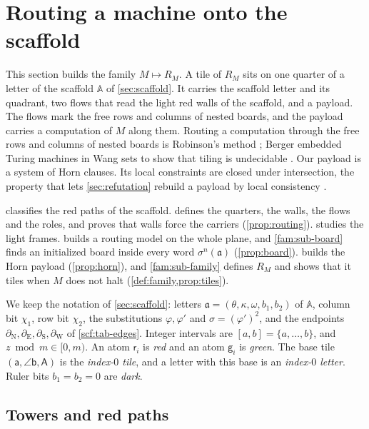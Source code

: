 \section{Routing a machine onto the scaffold}\label{sec:family}

This section builds the family $M\mapsto R_M$. A tile of $R_M$ sits on one quarter of a letter of the scaffold $\mathbb A$ of \cref{sec:scaffold}. It carries the scaffold letter and its quadrant, two flows that read the light red walls of the scaffold, and a payload. The flows mark the free rows and columns of nested boards, and the payload carries a computation of $M$ along them. Routing a computation through the free rows and columns of nested boards is Robinson's method \cite{Robinson71}; Berger embedded Turing machines in Wang sets to show that tiling is undecidable \cite{Berger66}. Our payload is a system of Horn clauses. Its local constraints are closed under intersection, the property that lets \cref{sec:refutation} rebuild a payload by local consistency \cite{JCG97,FederVardi98}.

 classifies the red paths of the scaffold.  defines the quarters, the walls, the flows and the roles, and proves that walls force the carriers (\cref{prop:routing}).  studies the light frames.  builds a routing model on the whole plane, and \cref{fam:sub-board} finds an initialized board inside every word $\sigma^n(\mathfrak a)$ (\cref{prop:board}).  builds the Horn payload (\cref{prop:horn}), and \cref{fam:sub-family} defines $R_M$ and shows that it tiles when $M$ does not halt (\cref{def:family,prop:tiles}).

We keep the notation of \cref{sec:scaffold}: letters $\mathfrak a=(\theta,\kappa,\omega,b_1,b_2)$ of $\mathbb A$, column bit $\chi_1$, row bit $\chi_2$, the substitutions $\varphi,\varphi'$ and $\sigma=(\varphi')^2$, and the endpoints $\partial_{\mathrm N},\partial_{\mathrm E},\partial_{\mathrm S},\partial_{\mathrm W}$ of \cref{scf:tab-edges}. Integer intervals are $[a,b]=\{a,\dots,b\}$, and $z\bmod m\in[0,m)$. An atom $\mathsf r_i$ is \emph{red} and an atom $\mathsf g_i$ is \emph{green}. The base tile $(\mathsf a,\angle\mathsf b,\mathsf A)$ is the \emph{index-$0$ tile}, and a letter with this base is an \emph{index-$0$ letter}. Ruler bits $b_1=b_2=0$ are \emph{dark}.

\subsection{Towers and red paths}\label{fam:sub-red}

